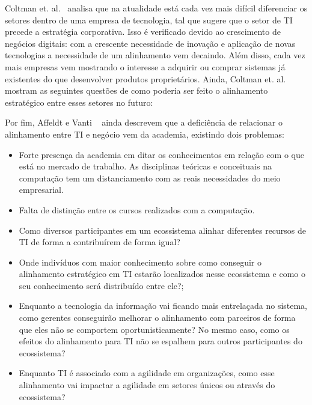 \documentclass[review]{elsarticle}
\begin{document}
Coltman et. al.~\cite{Coltman15} analisa que na atualidade está cada vez mais difícil diferenciar os setores dentro de uma empresa de tecnologia, tal que sugere que o setor de TI precede a estratégia corporativa. Isso é verificado devido ao crescimento de negócios digitais: com a crescente necessidade de inovação e aplicação de novas tecnologias a necessidade de um alinhamento vem decaindo. Além disso, cada vez mais empresas vem mostrando o interesse a adquirir ou comprar sistemas já existentes do que desenvolver produtos proprietários. Ainda, Coltman et. al. mostram as seguintes questões de como poderia ser feito o alinhamento estratégico entre esses setores no futuro: 

Por fim, Affeldt e Vanti ~\cite{Sobrosa2009} ainda descrevem que a deficiência de relacionar o alinhamento entre TI e negócio vem da academia, existindo dois problemas:
\begin{itemize}
	\item Forte presença da academia em ditar os conhecimentos em relação com o que está no mercado de trabalho. As disciplinas teóricas e conceituais na computação tem um distanciamento com as reais necessidades do meio empresarial.
	\item Falta de distinção entre os cursos realizados com a computação.
\end{itemize}

\begin{itemize}
	\item Como diversos participantes em um ecossistema alinhar diferentes recursos de TI de forma a contribuírem de forma igual?
	\item Onde indivíduos com maior conhecimento sobre como conseguir o alinhamento estratégico em TI estarão localizados nesse ecossistema e como o seu conhecimento será distribuído entre ele?;
	\item Enquanto a tecnologia da informação vai ficando mais entrelaçada no sistema, como gerentes conseguirão melhorar o alinhamento com parceiros de forma que eles não se comportem oportunisticamente? No mesmo caso, como os efeitos do alinhamento para TI não se espalhem para outros participantes do ecossistema?
	\item Enquanto TI é associado com a agilidade em organizações, como esse alinhamento vai impactar a agilidade em setores únicos ou através do ecossistema?
\end{itemize}
\end{document}
